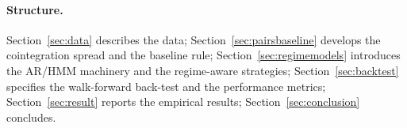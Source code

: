 \paragraph{Structure.}
Section~\ref{sec:data} describes the data; Section~\ref{sec:pairsbaseline} develops the cointegration spread and the baseline rule; Section~\ref{sec:regimemodels} introduces the AR/HMM machinery and the regime-aware strategies; Section~\ref{sec:backtest} specifies the walk-forward back-test and the performance metrics; Section~\ref{sec:result} reports the empirical results; Section~\ref{sec:conclusion} concludes.
